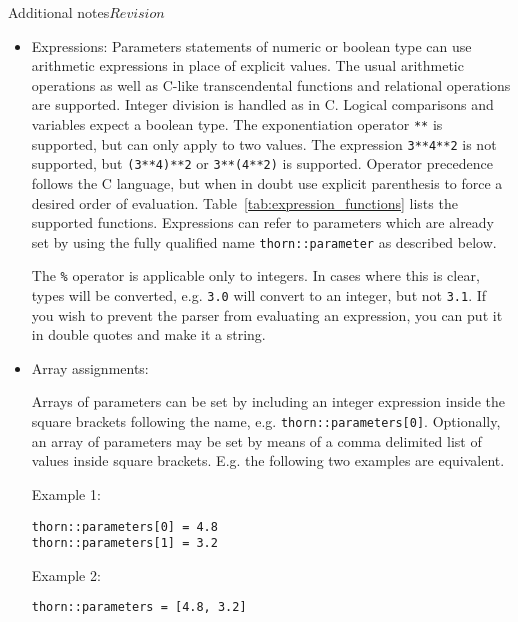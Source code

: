\begin{cactuspart}{Additional notes}{}{$Revision$}
\begin{itemize}
In addition to the above, it is possible to create and use other variables
by assignment, e.g.
\begin{verbatim}
$my_factor = 0.5
CoordBase::dx = 3.0*$my_factor
CoordBase::dy = 3.0*$my_factor
\end{verbatim}
\item Expressions:
Parameters statements of numeric or boolean type can use arithmetic
expressions in place of explicit values. The usual arithmetic operations
as well as C-like transcendental functions and relational operations are
supported. Integer division is handled as in C. Logical comparisons and
variables expect a boolean type.
The exponentiation operator \verb|**| is supported, but can only apply to two values.
The expression \verb|3**4**2| is not supported, but \verb|(3**4)**2| or
\verb|3**(4**2)| is supported. 
Operator precedence follows the C language, but when in doubt use explicit
parenthesis to force a desired order of evaluation.
Table~\ref{tab:expression_functions} lists the supported functions.
Expressions can refer to parameters which are already set by using the fully qualified
name \texttt{thorn::parameter} as described below.

The \verb|%| operator is applicable only to integers. In cases where this is
clear, types will be converted, e.g. \verb|3.0| will convert to an integer, but not \verb|3.1|.
If you wish to prevent the parser from evaluating an expression, you can put it
in double quotes and make it a string.

\item Array assignments:

Arrays of parameters can be set by including an integer expression inside
the square brackets following the name, e.g. \texttt{thorn::parameters[0]}.
Optionally, an array of parameters may be set by means of a comma delimited
list of values inside square brackets. E.g. the following two examples
are equivalent.

Example 1:
\begin{verbatim}
thorn::parameters[0] = 4.8
thorn::parameters[1] = 3.2
\end{verbatim}

Example 2:
\begin{verbatim}
thorn::parameters = [4.8, 3.2]
\end{verbatim}


\end{itemize}
\end{cactuspart}
